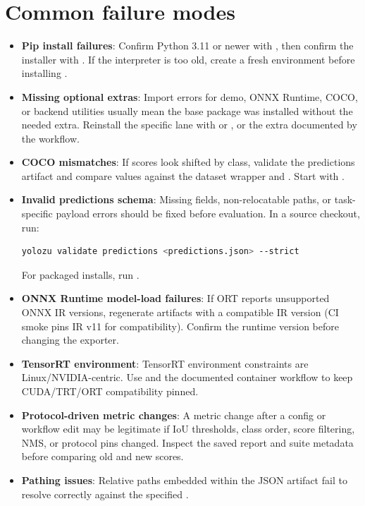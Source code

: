 \section{Common failure modes}
\begin{itemize}
  \item \textbf{Pip install failures}: Confirm Python 3.11 or newer with , then confirm the installer with . If the interpreter is too old, create a fresh environment before installing \yolozu{}.
  \item \textbf{Missing optional extras}: Import errors for demo, ONNX Runtime, COCO, or backend utilities usually mean the base package was installed without the needed extra. Reinstall the specific lane with  or , or the extra documented by the workflow.
  \item \textbf{COCO  mismatches}: If scores look shifted by class, validate the predictions artifact and compare  values against the dataset wrapper and . Start with .
  \item \textbf{Invalid predictions schema}: Missing fields, non-relocatable paths, or task-specific payload errors should be fixed before evaluation. In a source checkout, run:
\begin{lstlisting}[language=bash]
yolozu validate predictions <predictions.json> --strict
\end{lstlisting}
  For packaged installs, run .
  \item \textbf{ONNX Runtime model-load failures}: If ORT reports unsupported ONNX IR versions, regenerate artifacts with a compatible IR version (CI smoke pins IR v11 for compatibility). Confirm the runtime version before changing the exporter.
  \item \textbf{TensorRT environment}: TensorRT environment constraints are Linux/NVIDIA-centric. Use  and the documented container workflow to keep CUDA/TRT/ORT compatibility pinned.
  \item \textbf{Protocol-driven metric changes}: A metric change after a config or workflow edit may be legitimate if IoU thresholds, class order, score filtering, NMS, or protocol pins changed. Inspect the saved report and suite metadata before comparing old and new scores.
  \item \textbf{Pathing issues}: Relative paths embedded within the JSON artifact fail to resolve correctly against the specified .

\end{itemize}
